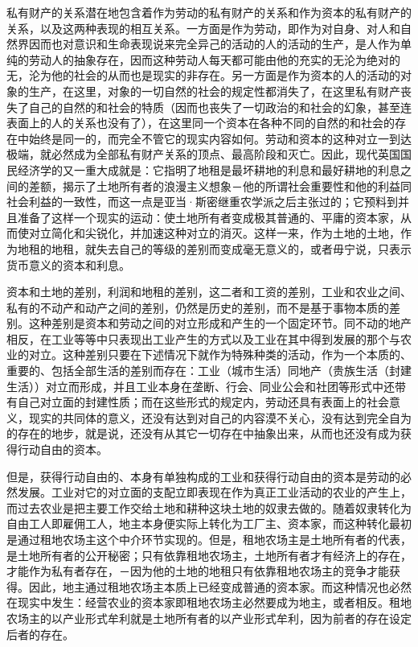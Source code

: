 \documentclass[a4paper,twoside,12pt]{ctexart}
\begin{document}
私有财产的关系潜在地包含着作为劳动的私有财产的关系和作为资本的私有财产的关系，以及这两种表现的相互关系。一方面是作为劳动，即作为对自身、对人和自然界因而也对意识和生命表现说来完全异己的活动的人的活动的生产，是人作为单纯的劳动人的抽象存在，因而这种劳动人每天都可能由他的充实的无沦为绝对的无，沦为他的社会的从而也是现实的非存在。另一方面是作为资本的人的活动的对象的生产，在这里，对象的一切自然的社会的规定性都消失了，在这里私有财产丧失了自己的自然的和社会的特质（因而也丧失了一切政治的和社会的幻象，甚至连表面上的人的关系也没有了），在这里同一个资本在各种不同的自然的和社会的存在中始终是同一的，而完全不管它的现实内容如何。劳动和资本的这种对立一到达极端，就必然成为全部私有财产关系的顶点、最高阶段和灭亡。因此，现代英国国民经济学的又一重大成就是：它指明了地租是最坏耕地的利息和最好耕地的利息之间的差额，揭示了土地所有者的浪漫主义想象－他的所谓社会重要性和他的利益同社会利益的一致性，而这一点是亚当·斯密继重农学派之后主张过的；它预料到并且准备了这样一个现实的运动：使土地所有者变成极其普通的、平庸的资本家，从而使对立简化和尖锐化，并加速这种对立的消灭。这样一来，作为土地的土地，作为地租的地租，就失去自己的等级的差别而变成毫无意义的，或者毋宁说，只表示货币意义的资本和利息。

资本和土地的差别，利润和地租的差别，这二者和工资的差别，工业和农业之间、私有的不动产和动产之间的差别，仍然是历史的差别，而不是基于事物本质的差别。这种差别是资本和劳动之间的对立形成和产生的一个固定环节。同不动的地产相反，在工业等等中只表现出工业产生的方式以及工业在其中得到发展的那个与农业的对立。这种差别只要在下述情况下就作为特殊种类的活动，作为一个本质的、重要的、包括全部生活的差别而存在：工业（城市生活）同地产（贵族生活（封建生活））对立而形成，并且工业本身在垄断、行会、同业公会和社团等形式中还带有自己对立面的封建性质；而在这些形式的规定内，劳动还具有表面上的社会意义，现实的共同体的意义，还没有达到对自己的内容漠不关心，没有达到完全自为的存在的地步，就是说，还没有从其它一切存在中抽象出来，从而也还没有成为获得行动自由的资本。

但是，获得行动自由的、本身有单独构成的工业和获得行动自由的资本是劳动的必然发展。工业对它的对立面的支配立即表现在作为真正工业活动的农业的产生上，而过去农业是把主要工作交给土地和耕种这块土地的奴隶去做的。随着奴隶转化为自由工人即雇佣工人，地主本身便实际上转化为工厂主、资本家，而这种转化最初是通过租地农场主这个中介环节实现的。但是，租地农场主是土地所有者的代表，是土地所有者的公开秘密；只有依靠租地农场主，土地所有者才有经济上的存在，才能作为私有者存在，－因为他的土地的地租只有依靠租地农场主的竞争才能获得。因此，地主通过租地农场主本质上已经变成普通的资本家。而这种情况也必然在现实中发生：经营农业的资本家即租地农场主必然要成为地主，或者相反。租地农场主的以产业形式牟利就是土地所有者的以产业形式牟利，因为前者的存在设定后者的存在。
\end{document}
